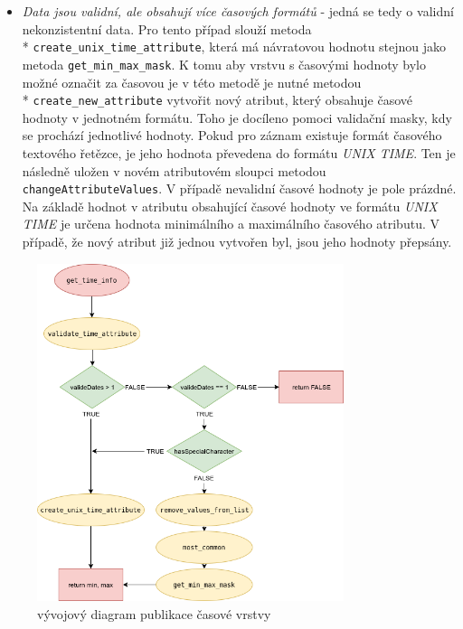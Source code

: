 \begin{itemize}
	\item\textit{Data jsou validní, ale obsahují více časových formátů} - jedná se tedy o validní nekonzistentní data. Pro tento případ slouží metoda \\* \verb|create_unix_time_attribute|, která má návratovou hodnotu stejnou jako metoda \verb|get_min_max_mask|. K tomu aby vrstvu s časovými hodnoty bylo možné označit za časovou je v této metodě je nutné metodou \\* \verb|create_new_attribute| vytvořit nový atribut, který obsahuje časové hodnoty v jednotném formátu. Toho je docíleno pomoci validační masky, kdy se prochází jednotlivé hodnoty. Pokud pro záznam existuje formát časového textového řetězce, je jeho hodnota převedena do formátu \textit{UNIX TIME}. Ten je následně uložen v novém atributovém sloupci metodou \verb|changeAttributeValues|. V případě nevalidní časové hodnoty je pole prázdné. Na základě hodnot v atributu obsahující časové hodnoty ve formátu \textit{UNIX TIME} je určena hodnota minimálního a maximálního časového atributu.
	V případě, že nový atribut již jednou vytvořen byl, jsou jeho hodnoty přepsány.
\end{itemize}

\begin{figure}[h!]
	\centering
	\includegraphics[width=0.8\textwidth]{../img/getTimeInfo.png}
	\caption{vývojový diagram publikace časové vrstvy}
	\label{fig:plugin-chart}
\end{figure}

